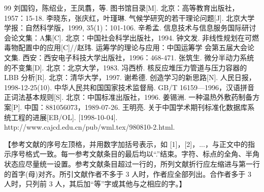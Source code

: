\clearpage
{}
{}

\begingroup
    \songtidigit\songti
    \setlength{\baselineskip}{20pt}
    
    \renewcommand{\refname}{参考文献}

    \makeatletter
    \renewcommand{\@biblabel}[1]{[#1]}
    \makeatother
    
    \begin{thebibliography}{99}
        \setlength{\topsep}{0pt}
        \setlength{\partopsep}{0pt}
        \addtolength{\itemsep}{-0.5em}
         刘国钧，陈绍业，王凤翥，等. 图书馆目录[M]. 北京：高等教育出版社，1957：15-18.
         李晓东，张庆红，叶瑾琳. 气候学研究的若干理论问题[J]. 北京大学学报：自然科学版，1999, 35(1)：101-106.
         辛希孟. 信息技术与信息服务国际研讨会论文集：A集[C]. 北京：中国社会科学出版社，1994.
         钟文发. 非线性规划在可燃毒物配置中的应用[C]//赵玮. 运筹学的理论与应用：中国运筹学
         会第五届大会论文集. 西安：西安电子科技大学出版社，1996：468-471.
         张筑生. 微分半动力系统的不变集[D]. 北京：北京大学，1983.
         冯西桥. 核反应堆压力管道与压力容器的 LBB 分析[R]. 北京：清华大学，1997.
         谢希德. 创造学习的新思路[N]. 人民日报，1998-12-25(10).
         中华人民共和国国家技术监督局. GB/T 16159—1996，汉语拼音正词法基本规则[S]. 北京：中国标准出版社，1996.
         姜锡洲. 一种温热外敷药制备方案[P]. 中国：881056073，1989-07-26.
         王明亮. 关于中国学术期刊标准化数据库系统工程的进展[EB/OL]. [1998-10-04]. http://www.cajcd.edu.cn/pub/wml.tex/980810-2.html.
    \end{thebibliography}
\endgroup

\vspace{1\baselineskip}
\begingroup
    \songti\color{red}
    \noindent 【参考文献的序号左顶格，并用数字加括号表示，如 [1]，[2]，...，与正文中的指示序号格式一致。每一参考文献条目的最后均以“.”结束。字符、标点的全角、半角状态应尽量统一设置。参考文献条目超过一行的，所列文献折行应左缩进与第一行的首字(母)对齐。所引文献作者不多于 3 人时，作者应全部列出。合作者多于 3 人时，只列前 3 人，其后加“等”字或其他与之相应的字。】
\endgroup
